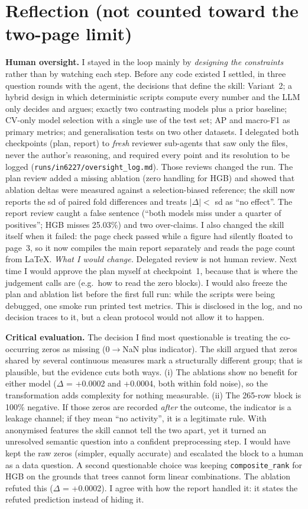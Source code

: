\documentclass[10pt]{article}
\begin{document}
\section*{Reflection {\normalfont\small(not counted toward the two-page limit)}}
\textbf{Human oversight.} I stayed in the loop mainly by \emph{designing the constraints} rather than by watching each step. Before any code existed I settled, in three question rounds with the agent, the decisions that define the skill: Variant~2; a hybrid design in which deterministic scripts compute every number and the LLM only decides and argues; exactly two contrasting models plus a prior baseline; CV-only model selection with a single use of the test set; AP and macro-F1 as primary metrics; and generalisation tests on two other datasets. I delegated both checkpoints (plan, report) to \emph{fresh} reviewer sub-agents that saw only the files, never the author's reasoning, and required every point and its resolution to be logged (\texttt{runs/in6227/oversight\_log.md}). Those reviews changed the run. The plan review added a missing ablation (zero handling for HGB) and showed that ablation deltas were measured against a selection-biased reference; the skill now reports the sd of paired fold differences and treats $|\Delta|<$ sd as ``no effect''. The report review caught a false sentence (``both models miss under a quarter of positives''; HGB misses 25.03\%) and two over-claims. I also changed the skill itself when it failed: the page check passed while a figure had silently floated to page~3, so it now compiles the main report separately and reads the page count from LaTeX.
\emph{What I would change.} Delegated review is not human review. Next time I would approve the plan myself at checkpoint~1, because that is where the judgement calls are (e.g.\ how to read the zero blocks). I would also freeze the plan and ablation list before the first full run: while the scripts were being debugged, one smoke run printed test metrics. This is disclosed in the log, and no decision traces to it, but a clean protocol would not allow it to happen.

\textbf{Critical evaluation.} The decision I find most questionable is treating the co-occurring zeros as missing (0$\to$NaN plus indicator). The skill argued that zeros shared by several continuous measures mark a structurally different group; that is plausible, but the evidence cuts both ways. (i) The ablations show no benefit for either model ($\Delta$ = +0.0002 and +0.0004, both within fold noise), so the transformation adds complexity for nothing measurable. (ii) The 265-row block is 100\% negative. If those zeros are recorded \emph{after} the outcome, the indicator is a leakage channel; if they mean ``no activity'', it is a legitimate rule. With anonymised features the skill cannot tell the two apart, yet it turned an unresolved semantic question into a confident preprocessing step. I would have kept the raw zeros (simpler, equally accurate) and escalated the block to a human as a data question. A second questionable choice was keeping \texttt{composite\_rank} for HGB on the grounds that trees cannot form linear combinations. The ablation refuted this ($\Delta$ = +0.0002). I agree with how the report handled it: it states the refuted prediction instead of hiding it.
\end{document}
